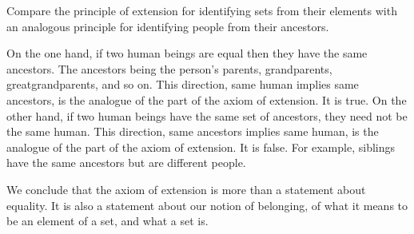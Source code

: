 Compare the principle of extension for identifying sets from their elements with an analogous principle for identifying people from their ancestors.

On the one hand, if two human beings are equal then they have the same ancestors.
The ancestors being the person's parents, grandparents, greatgrandparents, and so on.
This direction, same human implies same ancestors, is the analogue of the  part of the axiom of extension.
It is true.
On the other hand, if two human beings have the same set of ancestors, they need not be the same human.
This direction, same ancestors implies same human, is the analogue of the  part of the axiom of extension.
It is false.
For example, siblings have the same ancestors but are different people.

We conclude that the axiom of extension
is more than a statement about equality.
It is also a statement about our notion of
belonging, of what it means
to be an element of a set, and what a set is.

\blankpage

